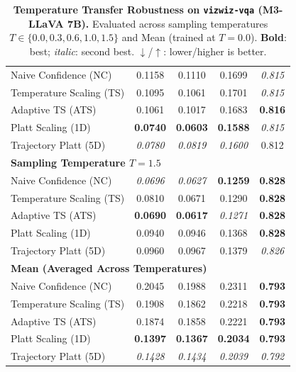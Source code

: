 \begin{table}[t]
{\begin{tabular}{lcccc}
\midrule
Naive Confidence (NC) & 0.1158 & 0.1110 & 0.1699 & \textit{0.815} \\
Temperature Scaling (TS) & 0.1095 & 0.1061 & 0.1701 & \textit{0.815} \\
Adaptive TS (ATS) & 0.1061 & 0.1017 & 0.1683 & \textbf{0.816} \\
Platt Scaling (1D) & \textbf{0.0740} & \textbf{0.0603} & \textbf{0.1588} & \textit{0.815} \\
Trajectory Platt (5D) & \textit{0.0780} & \textit{0.0819} & \textit{0.1600} & 0.812 \\
\midrule
\multicolumn{5}{l}{\textbf{Sampling Temperature $T = 1.5$}} \\
\midrule
Naive Confidence (NC) & \textit{0.0696} & \textit{0.0627} & \textbf{0.1259} & \textbf{0.828} \\
Temperature Scaling (TS) & 0.0810 & 0.0671 & 0.1290 & \textbf{0.828} \\
Adaptive TS (ATS) & \textbf{0.0690} & \textbf{0.0617} & \textit{0.1271} & \textbf{0.828} \\
Platt Scaling (1D) & 0.0940 & 0.0946 & 0.1368 & \textbf{0.828} \\
Trajectory Platt (5D) & 0.0960 & 0.0967 & 0.1379 & \textit{0.826} \\
\midrule
\multicolumn{5}{l}{\textbf{Mean (Averaged Across Temperatures)}} \\
\midrule
Naive Confidence (NC) & 0.2045 & 0.1988 & 0.2311 & \textbf{0.793} \\
Temperature Scaling (TS) & 0.1908 & 0.1862 & 0.2218 & \textbf{0.793} \\
Adaptive TS (ATS) & 0.1874 & 0.1858 & 0.2221 & \textbf{0.793} \\
Platt Scaling (1D) & \textbf{0.1397} & \textbf{0.1367} & \textbf{0.2034} & \textbf{0.793} \\
Trajectory Platt (5D) & \textit{0.1428} & \textit{0.1434} & \textit{0.2039} & \textit{0.792} \\
\bottomrule
\end{tabular}%
}
\caption{\textbf{Temperature Transfer Robustness on \texttt{vizwiz-vqa} (M3-LLaVA 7B).} Evaluated across sampling temperatures $T \in \{0.0, 0.3, 0.6, 1.0, 1.5\}$ and Mean (trained at $T=0.0$). \textbf{Bold}: best; \textit{italic}: second best. $\downarrow$/$\uparrow$: lower/higher is better.}
\label{tab:temp_transfer_m3_vizwizvqa}
\end{table}

